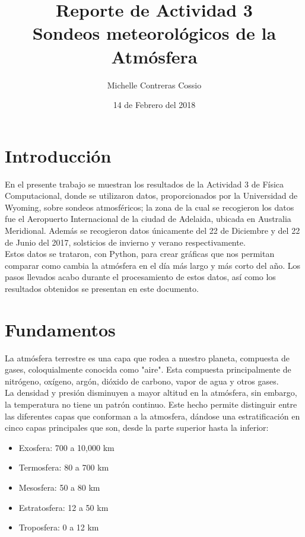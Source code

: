 \documentclass[a4paper]{article}
\title{Reporte de Actividad 3\\ Sondeos meteorológicos de la Atmósfera}
\author{Michelle Contreras Cossio}
\date{14 de Febrero del 2018}
\begin{document}
\maketitle

\section{Introducción}

En el presente trabajo se muestran los resultados de la Actividad 3 de Física Computacional, donde se utilizaron datos, proporcionados por la Universidad de Wyoming, sobre sondeos atmosféricos; la zona de la cual se recogieron los datos fue el Aeropuerto Internacional de la ciudad de Adelaida, ubicada en Australia Meridional. Además se recogieron datos únicamente del 22 de Diciembre y del 22 de Junio del 2017, solsticios de invierno y verano respectivamente. \\

Estos datos se trataron, con Python, para crear gráficas que nos permitan comparar como cambia la atmósfera en el día más largo y más corto del año. Los pasos llevados acabo durante el procesamiento de estos datos, así como los resultados obtenidos se presentan en este documento. 

\section{Fundamentos}
La atmósfera terrestre es una capa que rodea a nuestro planeta, compuesta de gases, coloquialmente conocida como "aire". Esta compuesta principalmente de nitrógeno, oxígeno, argón, dióxido de carbono, vapor de agua y otros gases. \\

La densidad y presión disminuyen a mayor altitud en la atmósfera, sin embargo, la temperatura no tiene un patrón continuo. Este hecho permite distinguir entre las diferentes capas que conforman a la atmosfera, dándose una estratificación en cinco capas principales que son, desde la parte superior hasta la inferior: 
\begin{itemize}
\item Exosfera: 700 a 10,000 km 
\item Termosfera: 80 a 700 km 
\item Mesosfera: 50 a 80 km
\item Estratosfera: 12 a 50 km 
\item Troposfera: 0 a 12 km 
\end{itemize} 
\end{document}
